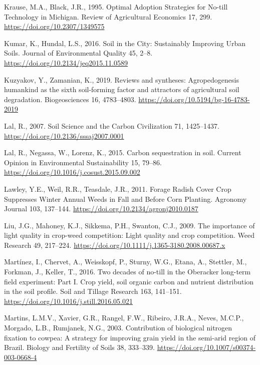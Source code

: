 \documentclass[
  12pt,
]{article}
\newlength{\cslhangindent}
\newlength{\cslentryspacingunit} %
\newenvironment{CSLReferences}[2] %
 {%
  \setlength{\parindent}{0pt}
  \ifodd #1
  \let\oldpar\par
  \def\par{\hangindent=\cslhangindent\oldpar}
  \fi
  \setlength{\parskip}{#2\cslentryspacingunit}
 }%
 {}
\begin{document}
\begin{CSLReferences}{1}{0}
\leavevmode{}%
Krause, M.A., Black, J.R., 1995. Optimal {Adoption Strategies} for {No-till Technology} in {Michigan}. Review of Agricultural Economics 17, 299. \url{https://doi.org/10.2307/1349575}

\leavevmode{}%
Kumar, K., Hundal, L.S., 2016. Soil in the {City}: {Sustainably Improving Urban Soils}. Journal of Environmental Quality 45, 2--8. \url{https://doi.org/10.2134/jeq2015.11.0589}

\leavevmode{}%
Kuzyakov, Y., Zamanian, K., 2019. Reviews and syntheses: {Agropedogenesis} \textendash{} humankind as the sixth soil-forming factor and attractors of agricultural soil degradation. Biogeosciences 16, 4783--4803. \url{https://doi.org/10.5194/bg-16-4783-2019}

\leavevmode{}%
Lal, R., 2007. Soil {Science} and the {Carbon Civilization} 71, 1425--1437. \url{https://doi.org/10.2136/sssaj2007.0001}

\leavevmode{}%
Lal, R., Negassa, W., Lorenz, K., 2015. Carbon sequestration in soil. Current Opinion in Environmental Sustainability 15, 79--86. \url{https://doi.org/10.1016/j.cosust.2015.09.002}

\leavevmode{}%
Lawley, Y.E., Weil, R.R., Teasdale, J.R., 2011. Forage {Radish Cover Crop Suppresses Winter Annual Weeds} in {Fall} and {Before Corn Planting}. Agronomy Journal 103, 137--144. \url{https://doi.org/10.2134/agronj2010.0187}

\leavevmode{}%
Liu, J.G., Mahoney, K.J., Sikkema, P.H., Swanton, C.J., 2009. The importance of light quality in crop-weed competition: {Light} quality and crop competition. Weed Research 49, 217--224. \url{https://doi.org/10.1111/j.1365-3180.2008.00687.x}

\leavevmode{}%
Martínez, I., Chervet, A., Weisskopf, P., Sturny, W.G., Etana, A., Stettler, M., Forkman, J., Keller, T., 2016. Two decades of no-till in the {Oberacker} long-term field experiment: {Part I}. {Crop} yield, soil organic carbon and nutrient distribution in the soil profile. Soil and Tillage Research 163, 141--151. \url{https://doi.org/10.1016/j.still.2016.05.021}

\leavevmode{}%
Martins, L.M.V., Xavier, G.R., Rangel, F.W., Ribeiro, J.R.A., Neves, M.C.P., Morgado, L.B., Rumjanek, N.G., 2003. Contribution of biological nitrogen fixation to cowpea: A strategy for improving grain yield in the semi-arid region of {Brazil}. Biology and Fertility of Soils 38, 333--339. \url{https://doi.org/10.1007/s00374-003-0668-4}


\end{CSLReferences}
\end{document}
